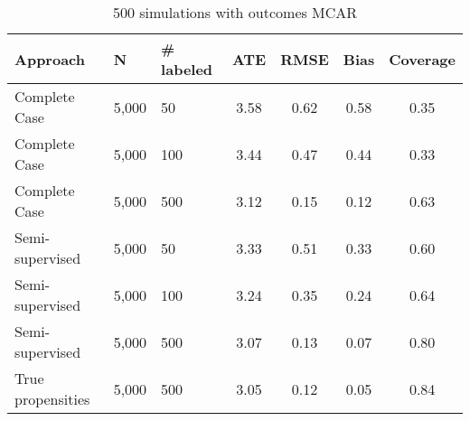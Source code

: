 \begin{table}[ht]
\centering
\begingroup\small
\begin{tabular}{lllcc>{\columncolor[gray]{.9}}c>{\columncolor[gray]{.9}}c}
  \hline
Approach & N & \# labeled & ATE & RMSE & Bias & Coverage \\ 
  \hline
  Complete Case & 5,000 &  50 & 3.58 & 0.62 & 0.58 & 0.35 \\ 
  Complete Case & 5,000 & 100 & 3.44 & 0.47 & 0.44 & 0.33 \\ 
  Complete Case & 5,000 & 500 & 3.12 & 0.15 & 0.12 & 0.63 \\ 
   \rowcolor[gray]{.8} Semi-supervised & 5,000 &  50 & 3.33 & 0.51 & 0.33 & 0.60 \\ 
   \rowcolor[gray]{.7} Semi-supervised & 5,000 & 100 & 3.24 & 0.35 & 0.24 & 0.64 \\ 
   \rowcolor[gray]{.6} Semi-supervised & 5,000 & 500 & 3.07 & 0.13 & 0.07 & 0.80 \\ 
   \rowcolor[gray]{.5} True propensities & 5,000 & 500 & 3.05 & 0.12 & 0.05 & 0.84 \\ 
   \hline
\end{tabular}
\endgroup
\caption{500 simulations with outcomes MCAR} 
\end{table}
